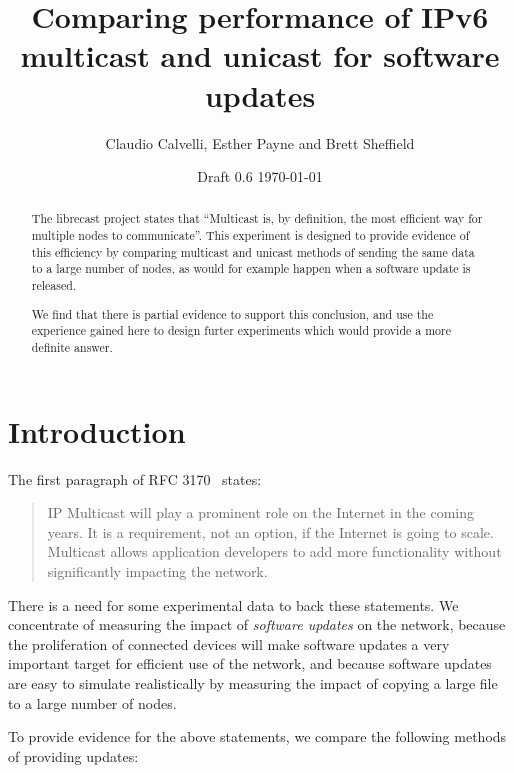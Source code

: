 \documentclass[a4paper,11pt,twocolumn]{article}
\title{Comparing performance of IPv6 multicast and unicast for software updates}
\author{Claudio Calvelli, Esther Payne and Brett Sheffield}
\date{Draft 0.6 \today}
\begin{document}
\maketitle

\begin{abstract}
The librecast project states that ``Multicast is, by definition, the most
efficient way for multiple nodes to communicate''.  This experiment is
designed to provide evidence of this efficiency by comparing multicast
and unicast methods of sending the same data to a large number of nodes,
as would for example happen when a software update is released.

We find that there is partial evidence to support this conclusion,
and use the experience gained here to design furter experiments which
would provide a more definite answer.
\end{abstract}

\section{Introduction}
The first paragraph of RFC 3170~\cite{rfc:3170} states:

\begin{quotation}
\noindent
IP Multicast will play a prominent role on the Internet in the coming
years.  It is a requirement, not an option, if the Internet is going
to scale.  Multicast allows application developers to add more
functionality without significantly impacting the network.
\end{quotation}

There is a need for some experimental data to back these statements.
We concentrate of measuring the impact of {\it software
updates\/} on the network, because the proliferation of connected
devices will make software updates a very important target for
efficient use of the network, and because software updates are
easy to simulate realistically by measuring the impact of copying
a large file to a large number of nodes.

To provide evidence for the above statements, we compare the
following methods of providing updates:
\end{document}
